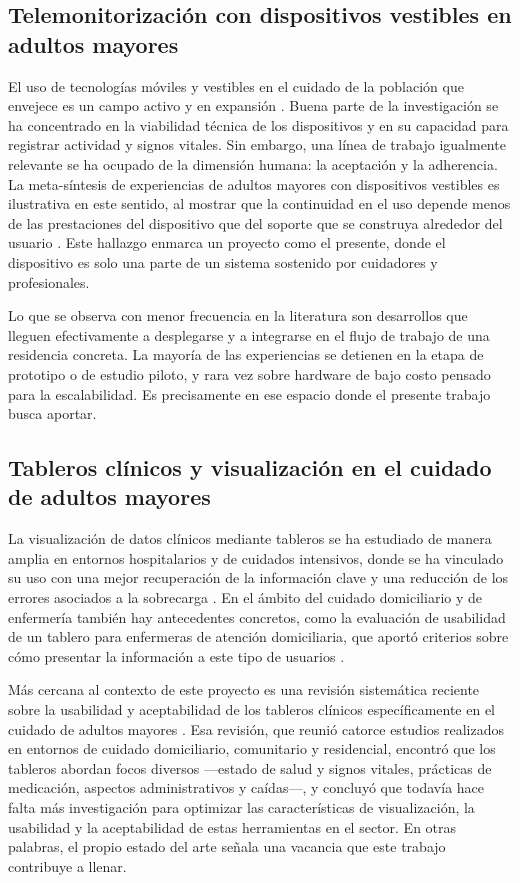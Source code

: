 \documentclass[12pt,a4paper]{article}
\begin{document}
    \subsection{Telemonitorización con dispositivos vestibles en adultos mayores}
    El uso de tecnologías móviles y vestibles en el cuidado de la población que envejece es un campo activo y en expansión \cite{malwade2018}. Buena parte de la investigación se ha concentrado en la viabilidad técnica de los dispositivos y en su capacidad para registrar actividad y signos vitales. Sin embargo, una línea de trabajo igualmente relevante se ha ocupado de la dimensión humana: la aceptación y la adherencia. La meta-síntesis de experiencias de adultos mayores con dispositivos vestibles es ilustrativa en este sentido, al mostrar que la continuidad en el uso depende menos de las prestaciones del dispositivo que del soporte que se construya alrededor del usuario \cite{moore2021}. Este hallazgo enmarca un proyecto como el presente, donde el dispositivo es solo una parte de un sistema sostenido por cuidadores y profesionales.

    Lo que se observa con menor frecuencia en la literatura son desarrollos que lleguen efectivamente a desplegarse y a integrarse en el flujo de trabajo de una residencia concreta. La mayoría de las experiencias se detienen en la etapa de prototipo o de estudio piloto, y rara vez sobre hardware de bajo costo pensado para la escalabilidad. Es precisamente en ese espacio donde el presente trabajo busca aportar.

    \subsection{Tableros clínicos y visualización en el cuidado de adultos mayores}
    La visualización de datos clínicos mediante tableros se ha estudiado de manera amplia en entornos hospitalarios y de cuidados intensivos, donde se ha vinculado su uso con una mejor recuperación de la información clave y una reducción de los errores asociados a la sobrecarga \cite{khairat2018}. En el ámbito del cuidado domiciliario y de enfermería también hay antecedentes concretos, como la evaluación de usabilidad de un tablero para enfermeras de atención domiciliaria, que aportó criterios sobre cómo presentar la información a este tipo de usuarios \cite{dowding2019}.

    Más cercana al contexto de este proyecto es una revisión sistemática reciente sobre la usabilidad y aceptabilidad de los tableros clínicos específicamente en el cuidado de adultos mayores \cite{siette2023}. Esa revisión, que reunió catorce estudios realizados en entornos de cuidado domiciliario, comunitario y residencial, encontró que los tableros abordan focos diversos —estado de salud y signos vitales, prácticas de medicación, aspectos administrativos y caídas—, y concluyó que todavía hace falta más investigación para optimizar las características de visualización, la usabilidad y la aceptabilidad de estas herramientas en el sector. En otras palabras, el propio estado del arte señala una vacancia que este trabajo contribuye a llenar.
\end{document}
